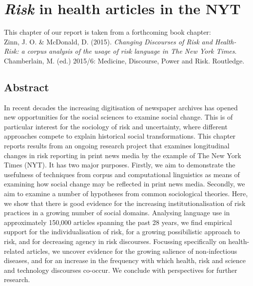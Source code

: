 

\chapter{\emph{Risk} in health articles in the NYT}

\vspace{5mm}
\noindent\begin{tcolorbox}[colback=yellow!5,colframe=yellow!40!black,title=Forthcoming chapter]
\parbox{1\textwidth}{%
This chapter of our report is taken from a forthcoming book chapter: \\ 

Zinn, J. O. \& McDonald, D. (2015). \emph{Changing Discourses of Risk and Health-Risk: a corpus analysis of the usage of risk language in The New York Times}. Chamberlain, M. (ed.) 2015/6: Medicine, Discourse, Power and Risk. Routledge.}
\end{tcolorbox}
\vspace{5mm}

\section*{Abstract}

In recent decades the increasing digitisation of newspaper archives has opened new opportunities for the social sciences to examine social change. This is of particular interest for the sociology of risk and uncertainty, where different approaches compete to explain historical social transformations. This chapter reports results from an ongoing research project that examines longitudinal changes in risk reporting in print news media by the example of The New York Times (NYT). It has two major purposes. Firstly, we aim to demonstrate the usefulness of techniques from corpus and computational linguistics as means of examining how social change may be reflected in print news media. Secondly, we aim to examine a number of hypotheses from common sociological theories. Here, we show that there is good evidence for the increasing institutionalisation of risk practices in a growing number of social domains. Analysing language use in approximately 150,000 articles spanning the past 28 years, we find empirical support for the individualisation of risk, for a growing possibilistic approach to risk, and for decreasing agency in risk discourses. Focussing specifically on health-related articles, we uncover evidence for the growing salience of non-infectious diseases, and for an increase in the frequency with which health, risk and science and technology discourses co-occur. We conclude with perspectives for further research.

